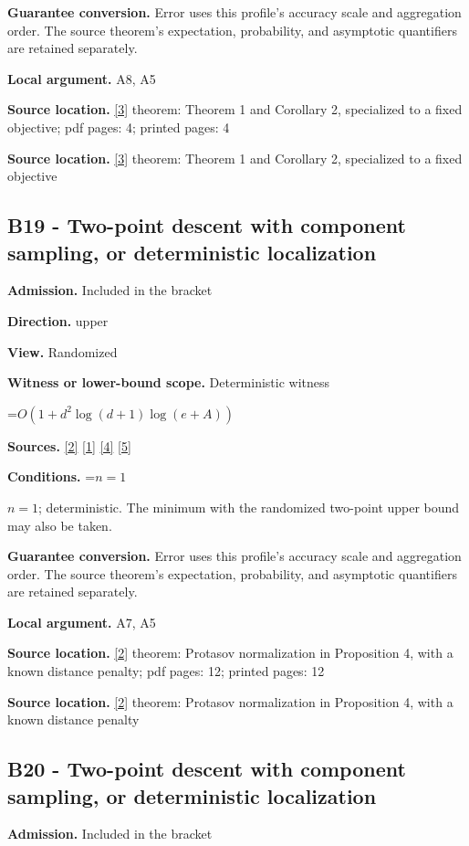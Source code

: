 \documentclass[10pt,a4paper]{article}
\newcommand{\AtlasMath}[1]{\par\begingroup\centering\setbox0=\hbox{$\displaystyle #1$}\ifdim\wd0>1.4\linewidth\typeout{ATLAS WIDE FORMULA: \the\wd0}\fi\ifdim\wd0>\linewidth\resizebox{\linewidth}{!}{\box0}\else\box0\fi\par\endgroup}
\newcommand{\AtlasInlineMath}[1]{\begingroup\setbox0=\hbox{$#1$}\ifdim\wd0>.4\linewidth\endgroup\AtlasMath{#1}\else\endgroup$#1$\fi}
\begin{document}
\textbf{Guarantee conversion.} Error uses this profile's accuracy scale and aggregation order. The source theorem's expectation, probability, and asymptotic quantifiers are retained separately.

\textbf{Local argument.} A8, A5

\textbf{Source location.} \href{https://jmlr.org/papers/volume18/16-632/16-632.pdf}{[3]} theorem: Theorem 1 and Corollary 2, specialized to a fixed objective; pdf pages: 4; printed pages: 4

\textbf{Source location.} \href{https://jmlr.org/papers/volume18/16-632/16-632.pdf}{[3]} theorem: Theorem 1 and Corollary 2, specialized to a fixed objective

\subsection{B19 - Two-point descent with component sampling, or deterministic localization}
\textbf{Admission.} Included in the bracket

\textbf{Direction.} upper

\textbf{View.} Randomized

\textbf{Witness or lower-bound scope.} Deterministic witness

\AtlasMath{O(1+d^2\log(d+1)\log(e+A))}
\textbf{Sources.} \href{https://arxiv.org/html/2607.16558v2}{[2]} \href{https://arxiv.org/html/2610.00345v1}{[1]} \href{https://www.mathnet.ru/php/archive.phtml?jrnid=mzm&option_lang=eng&paperid=1697&wshow=paper}{[4]} \href{https://arxiv.org/abs/2109.08858}{[5]}

\textbf{Conditions.} \AtlasInlineMath{n=1}; deterministic. The minimum with the randomized two-point upper bound may also be taken.

\textbf{Guarantee conversion.} Error uses this profile's accuracy scale and aggregation order. The source theorem's expectation, probability, and asymptotic quantifiers are retained separately.

\textbf{Local argument.} A7, A5

\textbf{Source location.} \href{https://arxiv.org/html/2607.16558v2}{[2]} theorem: Protasov normalization in Proposition 4, with a known distance penalty; pdf pages: 12; printed pages: 12

\textbf{Source location.} \href{https://arxiv.org/html/2607.16558v2}{[2]} theorem: Protasov normalization in Proposition 4, with a known distance penalty

\subsection{B20 - Two-point descent with component sampling, or deterministic localization}
\textbf{Admission.} Included in the bracket
\end{document}
